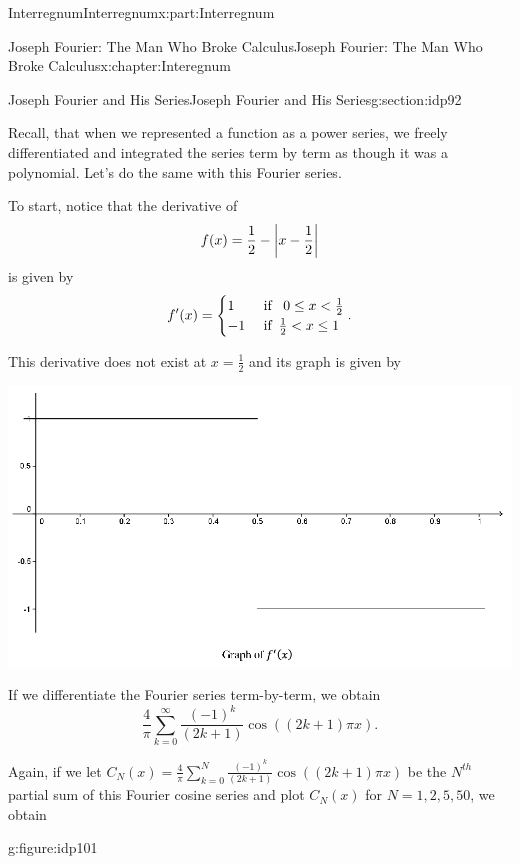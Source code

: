 \begin{partptx}{Interregnum}{}{Interregnum}{}{}{x:part:Interregnum}
\begin{chapterptx}{Joseph Fourier: The Man Who Broke Calculus}{}{Joseph Fourier: The Man Who Broke Calculus}{}{}{x:chapter:Interegnum}
\begin{sectionptx}{Joseph Fourier and His Series}{}{Joseph Fourier and His Series}{}{}{g:section:idp92}
			\par
			Recall, that when we represented a function as a power series, we freely differentiated and integrated the series term by term as though it was a polynomial. Let's do the same with this Fourier series.%
			\par
			To start, notice that the derivative of%
			\begin{equation*}
				f(x)=\frac{1}{2}-\left|x-\frac{1}{2}\right|
			\end{equation*}
			is given by%
			\begin{equation*}
				f^\prime(x) = \begin{cases}1& \text{ if } \,\text{ } 0\leq x< \frac{1}{2}\\ -1& \text{ if } \,\frac{1}{2}< x\leq 1 \end{cases} \text{.}
			\end{equation*}
			\par
			This derivative does not exist at \(x=\frac{1}{2}\) and its graph is given by%
			\begin{image}{0.125}{0.75}{0.125}%
				\includegraphics[width=\linewidth]{external/images/Ch2fig1.png}
			\end{image}%
			If we differentiate the Fourier series term-by-term, we obtain%
			\begin{equation*}
				\frac{4}{\pi}\sum_{k=0}^\infty\frac{\left(-1\right)^k}{\left(2k+1\right)} \cos\left(\left(2k+1\right)\pi x\right)\text{.}
			\end{equation*}
			\par
			Again, if we let \(C_N(x)=\frac{4}{\pi}\sum_{k=0}^N\frac{\left(-1\right)^k}{\left(2k+1\right)} \cos\left(\left(2k+1\right)\pi x\right)\) be the \(N^{th}\) partial sum of this Fourier cosine series and plot \(C_N(x)\) for \(N=1,2,5,50\), we obtain%
			\begin{figureptx}{}{g:figure:idp101}{}%

\end{figureptx}
\end{sectionptx}
\end{chapterptx}
\end{partptx}
